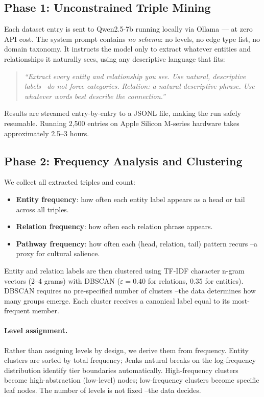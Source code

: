 \documentclass[11pt]{article}
\begin{document}
\subsection{Phase 1: Unconstrained Triple Mining}

Each dataset entry is sent to Qwen2.5-7b running locally via Ollama —
at zero API cost.
The system prompt contains \emph{no schema}: no levels, no edge type list,
no domain taxonomy.
It instructs the model only to extract whatever entities and relationships
it naturally sees, using any descriptive language that fits:

\begin{quote}
\small\textit{``Extract every entity and relationship you see.
Use natural, descriptive labels --do not force categories.
Relation: a natural descriptive phrase. Use whatever words best describe
the connection.''}
\end{quote}

Results are streamed entry-by-entry to a JSONL file, making the run
safely resumable.
Running 2,500 entries on Apple Silicon M-series hardware takes approximately
2.5--3 hours.

\subsection{Phase 2: Frequency Analysis and Clustering}

We collect all extracted triples and count:
\begin{itemize}
\item \textbf{Entity frequency}: how often each entity label appears
  as a head or tail across all triples.
\item \textbf{Relation frequency}: how often each relation phrase appears.
\item \textbf{Pathway frequency}: how often each (head, relation, tail)
  pattern recurs --a proxy for cultural salience.
\end{itemize}

Entity and relation labels are then clustered using TF-IDF character
n-gram vectors (2--4 grams) with DBSCAN
($\varepsilon = 0.40$ for relations, $0.35$ for entities).
DBSCAN requires no pre-specified number of clusters --the data determines
how many groups emerge.
Each cluster receives a canonical label equal to its most-frequent member.

\paragraph{Level assignment.}
Rather than assigning levels by design, we derive them from frequency.
Entity clusters are sorted by total frequency; Jenks natural breaks
\cite{jenks1967datamodel} on the log-frequency distribution identify
tier boundaries automatically.
High-frequency clusters become high-abstraction (low-level) nodes;
low-frequency clusters become specific leaf nodes.
The number of levels is not fixed --the data decides.
\end{document}
